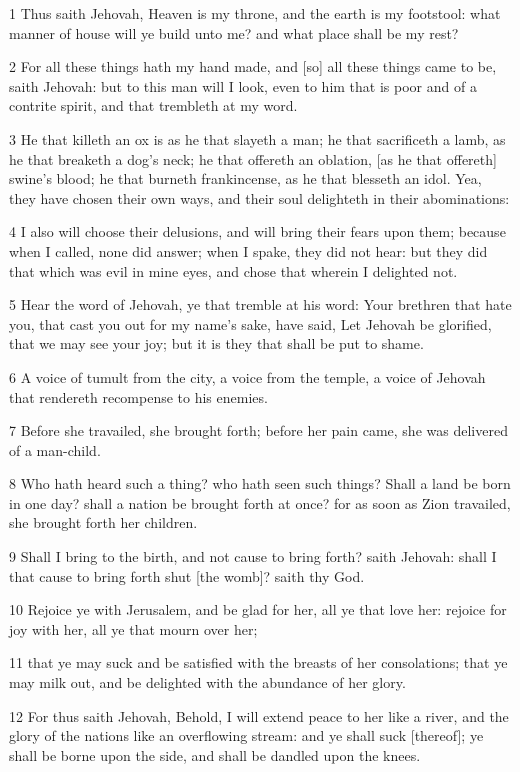 \par 1 Thus saith Jehovah, Heaven is my throne, and the earth is my footstool: what manner of house will ye build unto me? and what place shall be my rest?
\par 2 For all these things hath my hand made, and [so] all these things came to be, saith Jehovah: but to this man will I look, even to him that is poor and of a contrite spirit, and that trembleth at my word.
\par 3 He that killeth an ox is as he that slayeth a man; he that sacrificeth a lamb, as he that breaketh a dog's neck; he that offereth an oblation, [as he that offereth] swine's blood; he that burneth frankincense, as he that blesseth an idol. Yea, they have chosen their own ways, and their soul delighteth in their abominations:
\par 4 I also will choose their delusions, and will bring their fears upon them; because when I called, none did answer; when I spake, they did not hear: but they did that which was evil in mine eyes, and chose that wherein I delighted not.
\par 5 Hear the word of Jehovah, ye that tremble at his word: Your brethren that hate you, that cast you out for my name's sake, have said, Let Jehovah be glorified, that we may see your joy; but it is they that shall be put to shame.
\par 6 A voice of tumult from the city, a voice from the temple, a voice of Jehovah that rendereth recompense to his enemies.
\par 7 Before she travailed, she brought forth; before her pain came, she was delivered of a man-child.
\par 8 Who hath heard such a thing? who hath seen such things? Shall a land be born in one day? shall a nation be brought forth at once? for as soon as Zion travailed, she brought forth her children.
\par 9 Shall I bring to the birth, and not cause to bring forth? saith Jehovah: shall I that cause to bring forth shut [the womb]? saith thy God.
\par 10 Rejoice ye with Jerusalem, and be glad for her, all ye that love her: rejoice for joy with her, all ye that mourn over her;
\par 11 that ye may suck and be satisfied with the breasts of her consolations; that ye may milk out, and be delighted with the abundance of her glory.
\par 12 For thus saith Jehovah, Behold, I will extend peace to her like a river, and the glory of the nations like an overflowing stream: and ye shall suck [thereof]; ye shall be borne upon the side, and shall be dandled upon the knees.
